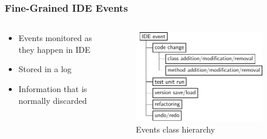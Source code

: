 \documentclass[aspectratio=169]{beamer}
\begin{document}
\begin{frame}[fragile]

\frametitle{Fine-Grained IDE Events}

\begin{columns}

\begin{column}{0.5\textwidth}

\begin{itemize}
\item Events monitored as they happen in IDE
\item Stored in a log
\item Information that is normally discarded
\end{itemize}
\end{column}

\begin{column}{0.5\textwidth}

\begin{figure}
\begin{center}
\includegraphics[width=0.9\textwidth]{img/events_model_diagram.pdf}
\end{center}
\caption{Events class hierarchy}
\end{figure}

\end{column}

\end{columns}

\end{frame}
\end{document}

